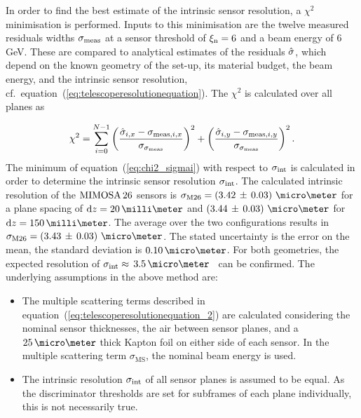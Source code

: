 In order to find the best estimate of the intrinsic sensor resolution, a $\chi^2$ minimisation is performed. 
Inputs to this minimisation are the twelve measured residuals widths $\sigma_{\textrm{meas}}$ at a sensor threshold of $\xi_{\textrm{n}} = 6$ and a beam energy of 6\,GeV. 
These are compared to analytical estimates of the residuals $\hat{\sigma}$, which depend on the known geometry of the set-up, its material budget, the beam energy,
 and the intrinsic sensor resolution, cf.~equation~(\ref{eq:telescoperesolutionequation}). 
The $\chi^2$ is calculated over all planes as

\begin{equation}
\label{eq:chi2_sigmai}
\chi^2 = \sum_{i = 0}^{N-1} \left( \frac{\hat{\sigma}_{i,x} - \sigma_{\textrm{meas},i,x}}{\sigma_{\sigma_{\textrm{meas}}}} \right)^2 + 
				    \left( \frac{\hat{\sigma}_{i,y} - \sigma_{\textrm{meas},i,y}}{\sigma_{\sigma_{\textrm{meas}}}} \right)^2.
\end{equation}
The minimum of equation~(\ref{eq:chi2_sigmai}) with respect to $\sigma_{\textrm{int}}$ is calculated in order to determine the intrinsic sensor resolution $\sigma_{\textrm{int}}$.
The calculated intrinsic resolution of the $\textrm{MIMOSA\,26}$ sensors is \allowbreak$\sigma_{\textrm{M26}} = \left( 3.42\,\pm\, \allowbreak 0.03 \right)\,\micro\meter$
 for a plane spacing of $\textrm{d}z =  20\,\milli\meter$ and $\left( 3.44\,\pm\, \allowbreak 0.03 \right)\,\micro\meter$ for $\textrm{d}z = 150\,\milli\meter$. 
The average over the two configurations results in $\sigma_{\textrm{M26}} = \left( 3.43\,\pm\, \allowbreak 0.03 \right)\,\micro\meter$. 
The stated uncertainty is the error on the mean, the standard deviation is $0.10\,\micro\meter$.
For both geometries, the expected resolution of $\sigmai \approx\,3.5\,\micro\meter$~\cite{ref:mimosa26} can be confirmed.
The underlying assumptions in the above method are:

\begin{itemize}

\item The multiple scattering terms described in equation~(\ref{eq:telescoperesolutionequation_2}) are calculated considering the nominal sensor thicknesses, the air between sensor planes, and a $25\,\micro\meter$
thick Kapton foil on either side of each sensor.
In the multiple scattering term $\sigma_{\textrm{MS}}$, the nominal beam energy is used. 

\item The intrinsic resolution $\sigma_{\textrm{int}}$ of all sensor planes is assumed to be equal.
As the discriminator thresholds are set for subframes of each plane individually, this is not necessarily true.

\end{itemize}


